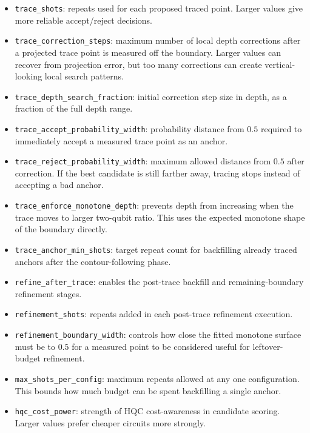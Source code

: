 \begin{itemize}
    \item \texttt{trace\_shots}: repeats used for each proposed traced point.
    Larger values give more reliable accept/reject decisions.

    \item \texttt{trace\_correction\_steps}: maximum number of local depth
    corrections after a projected trace point is measured off the boundary.
    Larger values can recover from projection error, but too many corrections
    can create vertical-looking local search patterns.

    \item \texttt{trace\_depth\_search\_fraction}: initial correction step size
    in depth, as a fraction of the full depth range.

    \item \texttt{trace\_accept\_probability\_width}: probability distance from
    \(0.5\) required to immediately accept a measured trace point as an anchor.

    \item \texttt{trace\_reject\_probability\_width}: maximum allowed distance
    from \(0.5\) after correction.  If the best candidate is still farther away,
    tracing stops instead of accepting a bad anchor.

    \item \texttt{trace\_enforce\_monotone\_depth}: prevents depth from
    increasing when the trace moves to larger two-qubit ratio.  This uses the
    expected monotone shape of the boundary directly.

    \item \texttt{trace\_anchor\_min\_shots}: target repeat count for backfilling
    already traced anchors after the contour-following phase.

    \item \texttt{refine\_after\_trace}: enables the post-trace backfill and
    remaining-boundary refinement stages.

    \item \texttt{refinement\_shots}: repeats added in each post-trace
    refinement execution.

    \item \texttt{refinement\_boundary\_width}: controls how close the fitted
    monotone surface must be to \(0.5\) for a measured point to be considered
    useful for leftover-budget refinement.

    \item \texttt{max\_shots\_per\_config}: maximum repeats allowed at any one
    configuration.  This bounds how much budget can be spent backfilling a
    single anchor.

    \item \texttt{hqc\_cost\_power}: strength of HQC cost-awareness in candidate
    scoring.  Larger values prefer cheaper circuits more strongly.
\end{itemize}

